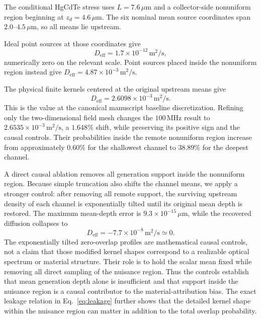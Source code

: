 \documentclass[aps,pra,twocolumn,superscriptaddress,nofootinbib]{revtex4-2}
\newcommand{\Deff}{D_{\mathrm{eff}}}
\begin{document}
The conditional HgCdTe stress uses $L=7.6\,\mu\mathrm{m}$ and a collector-side nonuniform region beginning at $z_d=4.6\,\mu\mathrm{m}$. The six nominal mean source coordinates span $2.0$--$4.5\,\mu\mathrm{m}$, so all means lie upstream.

Ideal point sources at those coordinates give
\begin{equation}
\Deff=1.7\times10^{-12}\,\mathrm{m^2/s},
\end{equation}
numerically zero on the relevant scale. Point sources placed inside the nonuniform region instead give $\Deff=4.87\times10^{-3}\,\mathrm{m^2/s}$.

The physical finite kernels centered at the original upstream means give
\begin{equation}
\Deff=2.6098\times10^{-3}\,\mathrm{m^2/s}.
\label{eq:hgcdteD}
\end{equation}
This is the value at the canonical manuscript baseline discretization.  Refining only the two-dimensional field mesh changes the $100\,\mathrm{MHz}$ result to $2.6535\times10^{-3}\,\mathrm{m^2/s}$, a $1.648\%$ shift, while preserving its positive sign and the causal controls.
Their probabilities inside the remote nonuniform region increase from approximately $0.60\%$ for the shallowest channel to $38.89\%$ for the deepest channel.

A direct causal ablation removes all generation support inside the nonuniform region. Because simple truncation also shifts the channel means, we apply a stronger control: after removing all remote support, the surviving upstream density of each channel is exponentially tilted until its original mean depth is restored. The maximum mean-depth error is $9.3\times10^{-15}\,\mu\mathrm{m}$, while the recovered diffusion collapses to
\begin{equation}
\Deff=-7.7\times10^{-8}\,\mathrm{m^2/s}\simeq0.
\end{equation}
The exponentially tilted zero-overlap profiles are mathematical causal controls, not a claim that those modified kernel shapes correspond to a realizable optical spectrum or material structure.  Their role is to hold the scalar mean fixed while removing all direct sampling of the nuisance region.
Thus the controls establish that mean generation depth alone is insufficient and that support inside the nuisance region is a causal contributor to the material-attribution bias.  The exact leakage relation in Eq.~\eqref{eq:leakage} further shows that the detailed kernel shape within the nuisance region can matter in addition to the total overlap probability.
\end{document}
